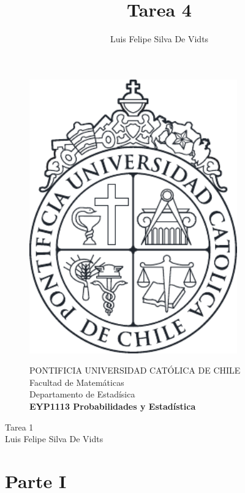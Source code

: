 \documentclass{article}
\title{Tarea 4\\}
\author{Luis Felipe Silva De Vidts}
\begin{document}
\begin{figure}
\begin{minipage}{2.5cm}
\includegraphics[width=0.8\textwidth]{./figures/LogoUC-BN}
\end{minipage}
\begin{minipage}{14.5cm}
\vspace{4mm}
{\sc PONTIFICIA UNIVERSIDAD CAT\'OLICA DE CHILE}\\
Facultad de Matemáticas\\
Departamento de Estadísica\\
{\bf EYP1113 Probabilidades y Estadística}\\
\vspace{0mm}
\hrulefill
\end{minipage}
\end{figure}
\phantom{""}
\vspace{-5mm}
\normalsize
\begin{center}
\Huge Tarea 1\\
\normalsize Luis Felipe Silva De Vidts
\end{center}
\section*{Parte I}
\end{document}
